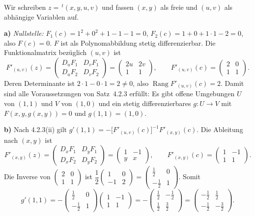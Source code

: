 \documentclass[a4paper,12pt]{article}
\begin{document}
Wir schreiben $z=\,^{t}(x,y,u,v)$ und fassen $(x,y)$ als \glqq freie\grqq{} und $(u,v)$ als \glqq abhängige\grqq{} Variablen auf.

\textbf{a)} \textit{Nullstelle:} $F_1(c)=1^2+0^2+1-1-1=0$, $F_2(c)=1+0+1\cdot1-2=0$, also $F(c)=0$. $F$ ist als Polynomabbildung stetig differenzierbar. Die Funktionalmatrix bezüglich $(u,v)$ ist
\[ F'_{(u,v)}(z)=\begin{pmatrix} D_uF_1 & D_vF_1\\ D_uF_2 & D_vF_2\end{pmatrix}=\begin{pmatrix} 2u & 2v\\ 1 & 1\end{pmatrix},\qquad
   F'_{(u,v)}(c)=\begin{pmatrix} 2 & 0\\ 1 & 1\end{pmatrix}. \]
Deren Determinante ist $2\cdot1-0\cdot1=2\neq 0$, also $\operatorname{Rang}F'_{(u,v)}(c)=2$. Damit sind alle Voraussetzungen von Satz~4.2.3 erfüllt: Es gibt offene Umgebungen $U$ von $(1,1)$ und $V$ von $(1,0)$ und ein stetig differenzierbares $g:U\to V$ mit $F(x,y,g(x,y))=0$ und $g(1,1)=(1,0)$.

\textbf{b)} Nach 4.2.3(ii) gilt $g'(1,1)=-\bigl[F'_{(u,v)}(c)\bigr]^{-1}F'_{(x,y)}(c)$. Die Ableitung nach $(x,y)$ ist
\[ F'_{(x,y)}(z)=\begin{pmatrix} D_xF_1 & D_yF_1\\ D_xF_2 & D_yF_2\end{pmatrix}=\begin{pmatrix} 1 & -1\\ y & x\end{pmatrix},\qquad
   F'_{(x,y)}(c)=\begin{pmatrix} 1 & -1\\ 1 & 1\end{pmatrix}. \]
Die Inverse von $\begin{pmatrix}2&0\\1&1\end{pmatrix}$ ist $\dfrac{1}{2}\begin{pmatrix}1&0\\-1&2\end{pmatrix}=\begin{pmatrix}\tfrac12&0\\[2pt]-\tfrac12&1\end{pmatrix}$. Somit
\[ g'(1,1)=-\begin{pmatrix}\tfrac12&0\\[2pt]-\tfrac12&1\end{pmatrix}\begin{pmatrix}1&-1\\1&1\end{pmatrix}
   = -\begin{pmatrix}\tfrac12&-\tfrac12\\[2pt]\tfrac12&\tfrac32\end{pmatrix}
   = \begin{pmatrix}-\tfrac12&\tfrac12\\[2pt]-\tfrac12&-\tfrac32\end{pmatrix}. \]
\end{document}
